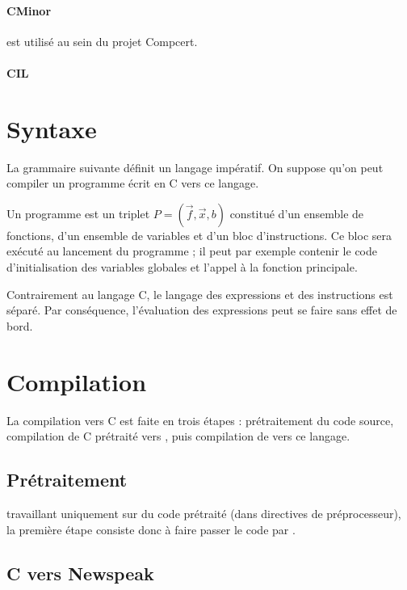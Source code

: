 \documentclass{phdthesis}
\begin{document}
\paragraph{CMinor} est utilisé au sein du projet Compcert.

\paragraph{CIL}

\section{Syntaxe}

La grammaire suivante définit un langage impératif. On suppose qu'on peut
compiler un programme écrit en C vers ce langage.

Un programme est un triplet $P = (\vec{f}, \vec{x}, b)$ constitué d'un ensemble
de fonctions, d'un ensemble de variables et d'un bloc d'instructions. Ce bloc
sera exécuté au lancement du programme ; il peut par exemple contenir le code
d'initialisation des variables globales et l'appel à la fonction principale.




Contrairement au langage C, le langage des expressions et des instructions est
séparé. Par conséquence, l'évaluation des expressions peut se faire sans effet de
bord.

\section{Compilation}

La compilation vers C est faite en trois étapes : prétraitement du code source,
compilation de C prétraité vers \newspeak{}, puis compilation de \newspeak{}
vers ce langage.



\subsection{Prétraitement}

\ctonewspeak{} travaillant uniquement sur du code prétraité (dans directives de
préprocesseur), la première étape consiste donc à faire passer le code par \cpp.

\subsection{C vers Newspeak}
\end{document}
